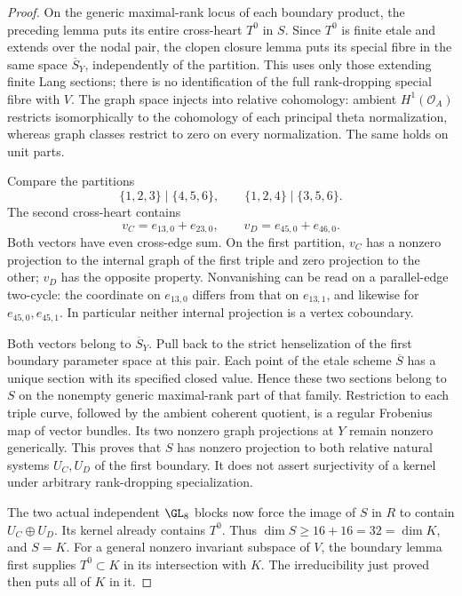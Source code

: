 \begin{proof}
On the generic maximal-rank locus of each boundary product,
the preceding lemma puts its entire cross-heart $T^0$ in $S$.
Since $T^0$ is finite etale and extends over the nodal pair,
the clopen closure lemma puts its special fibre in the same
space $\overline S_Y$, independently of the partition. This
uses only those extending finite Lang sections; there is no
identification of the full rank-dropping special fibre with $V$.
The graph space injects into relative cohomology: ambient
$H^1(\mathcal O_A)$ restricts isomorphically to the cohomology
of each principal theta normalization, whereas graph classes
restrict to zero on every normalization. The same holds on
unit parts.

Compare the partitions
\[
        \{1,2,3\}\mid\{4,5,6\},\qquad
        \{1,2,4\}\mid\{3,5,6\}.
\]
The second cross-heart contains
\[
             v_C=e_{13,0}+e_{23,0},\qquad
             v_D=e_{45,0}+e_{46,0}.
\]
Both vectors have even cross-edge sum. On the first partition,
$v_C$ has a nonzero projection to the internal graph of the
first triple and zero projection to the other; $v_D$ has the
opposite property. Nonvanishing can be read on a parallel-edge
two-cycle: the coordinate on $e_{13,0}$ differs from that on
$e_{13,1}$, and likewise for $e_{45,0},e_{45,1}$. In particular
neither internal projection is a vertex coboundary.

Both vectors belong to $\overline S_Y$. Pull back to the strict
henselization of the first boundary parameter space at this
pair. Each point of the etale scheme $\overline S$ has a unique
section with its specified closed value. Hence these two
sections belong to $S$ on the nonempty generic maximal-rank
part of that family. Restriction to each triple curve, followed
by the ambient coherent quotient, is a regular Frobenius map
of vector bundles. Its two nonzero graph projections at $Y$
remain nonzero generically. This proves that $S$ has nonzero
projection to both relative natural systems $U_C,U_D$ of the
first boundary. It does not assert surjectivity of a kernel
under arbitrary rank-dropping specialization.

The two actual independent $\GL_8$ blocks now force the image
of $S$ in $R$ to contain $U_C\oplus U_D$. Its kernel already
contains $T^0$. Thus $\dim S\ge16+16=32=\dim K$, and $S=K$.
For a general nonzero invariant subspace of $V$, the boundary
lemma first supplies $T^0\subset K$ in its intersection with
$K$. The irreducibility just proved then puts all of $K$ in it.
\end{proof}

